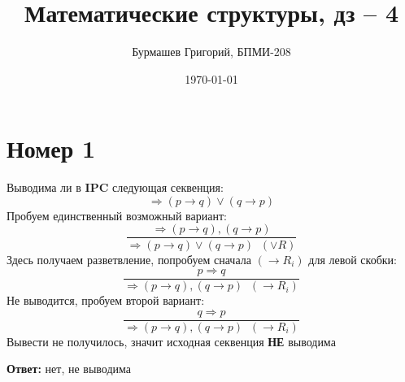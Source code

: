 \documentclass[a4paper,12pt]{article}
\author{Бурмашев Григорий, БПМИ-208}
\title{Математические структуры, дз -- 4}
\date{\today}
\begin{document}
\maketitle
\section*{Номер 1}
Выводима ли в \textbf{IPC} следующая секвенция:
\[
\Rightarrow (p \rightarrow q) \vee (q \rightarrow p )
\]
Пробуем единственный возможный вариант:
\[
\dfrac{\Rightarrow (p \rightarrow q),(q \rightarrow p )}{\Rightarrow (p \rightarrow q) \vee (q \rightarrow p ) \; \; (\vee R)}
\]
Здесь получаем разветвление, попробуем сначала $(\rightarrow R_i)$ для левой скобки:
\[
\dfrac{p \Rightarrow  q}{\Rightarrow (p \rightarrow q),(q \rightarrow p ) \; \; (\rightarrow R_i) }
\]
Не выводится, пробуем второй вариант:
\[
\dfrac{q \Rightarrow p}{\Rightarrow (p \rightarrow q),(q \rightarrow p ) \; \; (\rightarrow R_i) }
\]
Вывести не получилось, значит исходная секвенция \textbf{НЕ} выводима 
\begin{center}
\textbf{Ответ: } нет, не выводима
\end{center}
\end{document}
